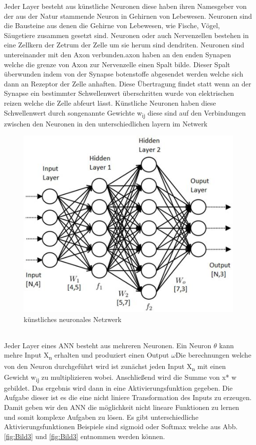 \documentclass{llncs}
\begin{document}
Jeder Layer besteht aus künstliche Neuronen diese haben ihren Namesgeber von der aus der Natur stammende Neuron in Gehirnen von Lebewesen. Neuronen sind die Bausteine aus denen die Gehirne von Lebewesen, wie Fische, Vögel, Säugetiere zusammen gesetzt sind. Neuronen oder auch Nervenzellen bestehen in eine Zellkern der Zetrum der Zelle um sie herum sind dendriten. Neuronen sind untereinander mit den Axon verbunden.axon haben an den enden Synapen welche die grenze von Axon zur Nervenzelle einen Spalt bilde. Dieser Spalt überwunden indem von der Synapse botenstoffe abgesendet werden welche sich dann an Rezeptor der Zelle anhaften. Diese Übertragung findet statt wenn an der Synapse ein bestimmter Schwellenwert überschritten wurde von elektrischen reizen welche die Zelle abfeurt lässt. Künstliche Neuronen haben diese Schwellenwert durch songenannte Gewichte w\textsubscript{ij} diese sind auf den Verbindungen zwischen den Neuronen in den unterschiedlichen layern im Netwerk
\begin{figure}[htbp] 
	\centering
	\includegraphics[width=1.0\textwidth]{neuronalesnetzwerk.jpg}
	\caption{künstliches neuronales Netzwerk}
	\label{fig:Bild2}
\end{figure}
\\
Jeder Layer eines ANN besteht aus mehreren Neuronen. Ein Neuron $\theta$ kann mehre Input X\textsubscript{n} erhalten und produziert einen Output $\omega$\. Die berechnungen welche von den Neuron durchgeführt wird ist zunächst jeden Input X\textsubscript{n} mit einen Gewicht w\textsubscript{ij} zu multiplizieren wobei. Anschließend wird die Summe von x* w gebildet. Das ergebnis wird dann in eine Aktivierungsfunktion gegeben. Die Aufgabe dieser ist es die eine nicht liniere Transformation des Inputs zu erzeugen. Damit geben wir den ANN die möglichkeit nicht lineare Funktionen zu lernen und somit komplexe Aufgaben zu lösen. Es gibt unterschiedliche Aktivierungsfunktionen Beispiele sind sigmoid oder Softmax welche aus Abb. \ref{fig:Bild3} und \ref{fig:Bild3} entnommen werden können.
\end{document}
